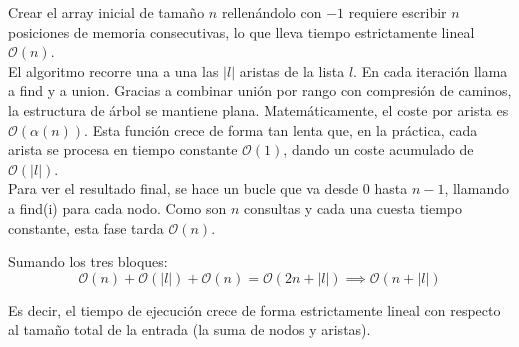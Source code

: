 \documentclass{article}
\begin{document}
\begin{enumerate}

     Crear el array inicial de tamaño $n$ rellenándolo con $-1$ requiere escribir $n$ posiciones de memoria consecutivas, lo que lleva tiempo estrictamente lineal $\mathcal{O}(n)$. \\
     El algoritmo recorre una a una las $\vert{}l\vert{}$ aristas de la lista $l$. En cada iteración llama a find y a union. Gracias a combinar unión por rango con compresión de caminos, la estructura de árbol se mantiene plana. Matemáticamente, el coste por arista es $\mathcal{O}(\alpha(n))$. Esta función crece de forma tan lenta que, en la práctica, cada arista se procesa en tiempo constante $\mathcal{O}(1)$, dando un coste acumulado de $\mathcal{O}(\vert{}l\vert{})$.\\
     Para ver el resultado final, se hace un bucle que va desde $0$ hasta $n-1$, llamando a find(i) para cada nodo. Como son $n$ consultas y cada una cuesta tiempo constante, esta fase tarda $\mathcal{O}(n)$.

     \end{enumerate}
     
     \vspace{0.5cm}
     

     \noindent Sumando los tres bloques:
    $$\mathcal{O}(n) + \mathcal{O}(|l|) + \mathcal{O}(n) = \mathcal{O}(2n + |l|) \implies \mathcal{O}(n + |l|)$$

    \noindent Es decir, el tiempo de ejecución crece de forma estrictamente lineal con respecto al tamaño total de la entrada (la suma de nodos y aristas).

    
\end{document}
